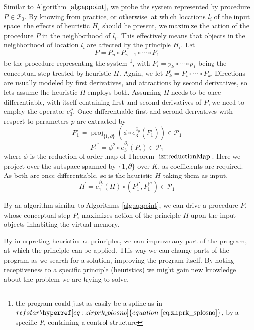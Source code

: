 \documentclass{article}
\makeatletter
\newcommand{\dP}{\mathcal{P}}
\newcommand{\D}{\partial}
\DeclareMathOperator{\proj}{proj}
\let\originaleqref\eqref %
\renewcommand{\eqref}[1]{%
  \begingroup%
  \let\ref\@refstar%
  \hyperref[#1]{%
    equation%
    ~\originaleqref{#1}%
  }%
  \endgroup
}
\makeatother
\begin{document}
Similar to Algorithm $\ref{alg:appoint}$, we probe the system represented by procedure $P\in\dP_0$. By knowing from practice, or otherwise, at which locations $l_i$ of the input space, the effects of heuristic $H_i$ should be present, we maximize the action of the procedure $P$ in the neighborhood of $l_i$. This effectively means that objects in the neighborhood of location $l_i$ are affected by the principle $H_i$.
Let
\begin{equation}
P=P_n\circ P_{n-1}\circ\cdots\circ P_1
\end{equation}
be the procedure representing the system \footnote{the program could just as easily be a spline as in $\eqref{eq:zlrprk_splosno}$, by a specific $P_i$ containing a control structure}, with $P_i=p_k\circ\cdots\circ p_1$ being the conceptual step treated by heuristic $H$. Again, we let $P^i_k=P_i\circ\cdots\circ P_k$. Directions are usually modeled by first derivatives, and attractions by second derivatives, so lets assume the heuristic $H$ employs both. 
Assuming $H$ needs to be once differentiable, with itself containing first and second derivatives of $P$, we need to employ the operator $e^\D_3$. Once differentiable first and second derivatives with respect to parameters $p$ are extracted by
\begin{equation}
P^{i\prime}_1=\proj_{\{1,\D\}}\left(\phi\circ e^{\D_{p}}_3(P^i_1)\right)\in\dP_1
\end{equation}
\begin{equation}
P^{i\prime\prime}_1=\phi^2\circ e^{\D_p}_3(P_i)\in\dP_1
\end{equation}
where $\phi$ is the reduction of order map of Theorem $\ref{izr:reductionMap}$. Here we project over the subspace spanned by $\{1,\D\}$ over $K$, as coefficients are required. As both are once differentiable, so is the heuristic $H$ taking them as input.
\begin{equation}
H^\prime=e^{\D_p}_1(H)\circ(P^{i\prime}_1,P^{i\prime\prime}_1)\in\dP_1
\end{equation}

By an algorithm similar to Algorithms \ref{alg:appoint}, we can drive a procedure $P$, whose conceptual step $P_i$ maximizes action of the principle $H$ upon the input objects inhabiting the virtual memory.

By interpreting heuristics as principles, we can improve any part of the program, at which the principle can be applied. This way we can change parts of the program as we search for a solution, improving the program itself. By noting receptiveness to a specific principle (heuristics) we might gain new knowledge about the problem we are trying to solve.
\end{document}
